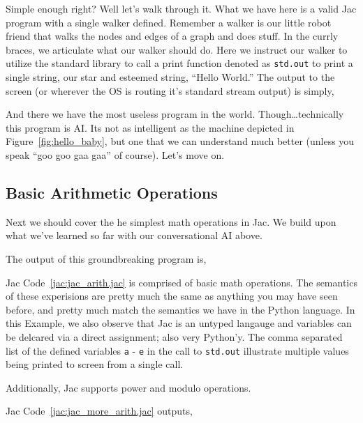 
Simple enough right? Well let's walk through it. What we have here is a valid Jac program with a single walker defined. Remember a walker is our little robot friend that walks the nodes and edges of a graph and does stuff. In the currly braces, we articulate what our walker should do. Here we instruct our walker to utilize the standard library to call a print function denoted as \texttt{std.out} to print a single string, our star and esteemed string, ``Hello World.'' The output to the screen (or wherever the OS is routing it's standard stream output) is simply,


And there we have the most useless program in the world. Though\dots technically this program is AI. Its not as intelligent as the machine depicted in Figure~\ref{fig:hello_baby}, but one that we can understand much better (unless you speak ``\gls{goo goo gaa gaa}'' of course). Let's move on.

\subsection{Basic Arithmetic Operations}
Next we should cover the he simplest math operations in Jac. We build upon what we've learned so far with our conversational AI above.


The output of this groundbreaking program is,


Jac Code~\ref{jac:jac_arith.jac} is comprised of basic math operations. The semantics of these experisions are pretty much the same as anything you may have seen before, and pretty much match the semantics we have in the Python language. In this Example, we also observe that Jac is an untyped langauge and variables can be delcared via a direct assignment; also very Python'y. The comma separated list of the defined variables \texttt{a} - \texttt{e} in the call to \texttt{std.out} illustrate multiple values being printed to screen from a single call.
\par
Additionally, Jac supports power and modulo operations.


Jac Code~\ref{jac:jac_more_arith.jac} outputs,

